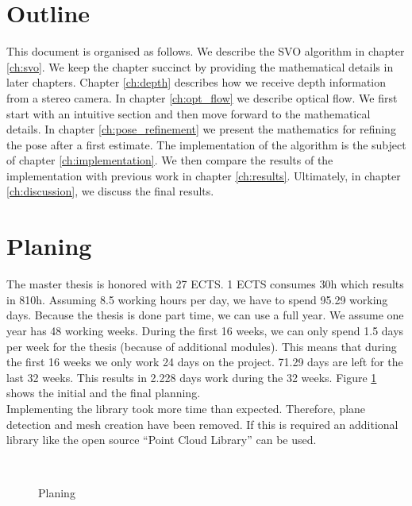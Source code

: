 \documentclass[11pt,a4paper,titlepage,oneside]{report}
\begin{document}
\section{Outline}

This document is organised as follows. We describe the SVO algorithm in chapter \ref{ch:svo}. We keep the chapter succinct by providing the mathematical details in later chapters. Chapter \ref{ch:depth} describes how we receive depth information from a stereo camera. In chapter \ref{ch:opt_flow} we describe optical flow. We first start with an intuitive section and then move forward to the mathematical details. In chapter \ref{ch:pose_refinement} we present the mathematics for refining  the pose after a first estimate. The implementation of the algorithm is the subject of chapter \ref{ch:implementation}. We then compare the results of the implementation with previous work in chapter \ref{ch:results}. Ultimately, in chapter \ref{ch:discussion}, we discuss the final results.

\section{Planing}
The master thesis is honored with 27 ECTS. 1 ECTS consumes 30h which results in 810h. Assuming 8.5 working hours per day, we have to spend 95.29 working days. Because the thesis is done part time, we can use a full year. We assume one year has 48 working weeks. During the first 16 weeks, we can only spend 1.5 days per week for the thesis (because of additional modules). This means that during the first 16 weeks we only work 24 days on the project. 71.29 days are left for the last 32 weeks. This results in 2.228 days work during the 32 weeks. Figure \ref{fig:gantt} shows the initial and the final planning.\\
Implementing the library took more time than expected. Therefore, plane detection and mesh creation have been removed. If this is required an additional library like the open source ``Point Cloud Library'' \cite{pcl} can be used.

\begin{figure}[H]
  \\
  \caption{Planing}\label{fig:gantt}
\end{figure}
\end{document}
